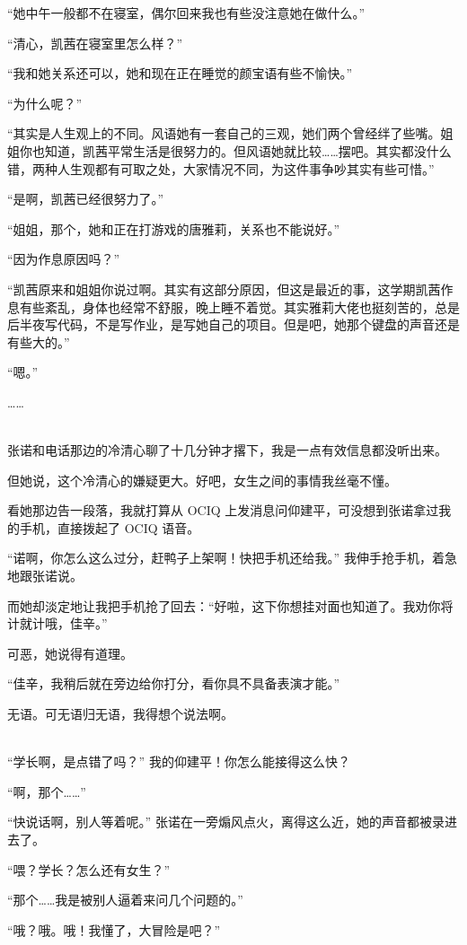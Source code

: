 \documentclass[UTF8]{ctexart}
\begin{document}
“她中午一般都不在寝室，偶尔回来我也有些没注意她在做什么。”

“清心，凯茜在寝室里怎么样？”

“我和她关系还可以，她和现在正在睡觉的颜宝语有些不愉快。”

“为什么呢？”

“其实是人生观上的不同。风语她有一套自己的三观，她们两个曾经绊了些嘴。姐姐你也知道，凯茜平常生活是很努力的。但风语她就比较……摆吧。其实都没什么错，两种人生观都有可取之处，大家情况不同，为这件事争吵其实有些可惜。”

“是啊，凯茜已经很努力了。”

“姐姐，那个，她和正在打游戏的唐雅莉，关系也不能说好。”

“因为作息原因吗？”

“凯茜原来和姐姐你说过啊。其实有这部分原因，但这是最近的事，这学期凯茜作息有些紊乱，身体也经常不舒服，晚上睡不着觉。其实雅莉大佬也挺刻苦的，总是后半夜写代码，不是写作业，是写她自己的项目。但是吧，她那个键盘的声音还是有些大的。”

“嗯。”

……

~\\

张诺和电话那边的冷清心聊了十几分钟才撂下，我是一点有效信息都没听出来。

但她说，这个冷清心的嫌疑更大。好吧，女生之间的事情我丝毫不懂。

看她那边告一段落，我就打算从 OCIQ 上发消息问仰建平，可没想到张诺拿过我的手机，直接拨起了 OCIQ 语音。

“诺啊，你怎么这么过分，赶鸭子上架啊！快把手机还给我。” 我伸手抢手机，着急地跟张诺说。

而她却淡定地让我把手机抢了回去：“好啦，这下你想挂对面也知道了。我劝你将计就计哦，佳辛。”

可恶，她说得有道理。

“佳辛，我稍后就在旁边给你打分，看你具不具备表演才能。”

无语。可无语归无语，我得想个说法啊。

~\\

“学长啊，是点错了吗？” 我的仰建平！你怎么能接得这么快？

“啊，那个……”

“快说话啊，别人等着呢。” 张诺在一旁煽风点火，离得这么近，她的声音都被录进去了。

“喂？学长？怎么还有女生？”

“那个……我是被别人逼着来问几个问题的。”

“哦？哦。哦！我懂了，大冒险是吧？”
\end{document}
